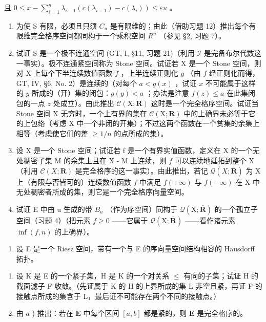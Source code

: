 且 \(0 \leqslant x - \sum_{i=1}^{n} \lambda_{i-1} (c(\lambda_{i-1}) - c(\lambda_i)) \leqslant \varepsilon u\) 。

\begin{enumerate}
\def\labelenumi{\alph{enumi})}
\setcounter{enumi}{4}
\item
  为使 S 有限，必须且只须 \(C_{u}\) 是有限维的；由此（借助习题 12）推出每个有限维完全格序空间都同构于一个乘积空间 \(R^{n}\) （参见 §2, 习题 7）。
\item
  试证 S 是一个极不连通空间 (GT, I, §11, 习题 21)（利用 \(\mathcal{I}\) 是完备布尔代数这一事实）。极不连通紧空间称为 Stone 空间。试证若 X 是一个 Stone 空间，则对 X 上每个下半连续数值函数 \(f\) ，上半连续正则化 \(g\) （由 \(f\) 经正则化而得，GT, IV, §6, No. 2）是连续的（对每个 \(a < g(x)\) ，试证 \(x\) 不可能属于这样的 \(y\) 所成的（开）集的闭包：\(g(y) < a\) ；办法是注意 \(f(z) \leqslant a\) 在此集闭包的一点 \(z\) 处成立）。由此推出 \(\mathcal{C}(\mathrm{X};\mathbf{R})\) 这时是一个完全格序空间。试证当 Stone 空间 X 无穷时，一个上有界的集在 \(\mathcal{C}(\mathrm{X};\mathbf{R})\) 中的上确界未必等于它的上包络（考虑 X 中一个非闭的开集）；不过这两个函数在一个贫集的余集上相等（考虑使它们的差 \(\geqslant 1/n\) 的点所成的集）。
\item
  设 X 是一个 Stone 空间；试证若 f 是一个有界实值函数，定义在 X 的一个无处稠密子集 M 的余集上且在 X - M 上连续，则 \(f\) 可以连续地延拓到整个 X（利用 \(\mathcal{C}(X; \mathbf{R})\) 是完全格序的这一事实）。由此推出，若记 \(\mathcal{Q}(X; \overline{\mathbf{R}})\) 为 X 上（有限与否皆可的）连续数值函数 \(f\) 中满足 \(f(+\infty)\) 与 \(f(-\infty)\) 在 X 中无处稠密者所成的集，则它是一个完全格序向量空间。
\item
  试证 E 中由 u 生成的带 \(B_{u}\) （作为序空间）同构于 \(\mathcal{Q}(\mathrm{X};\overline{\mathbf{R}})\) 的一个孤立子空间（习题 4）（把元素 \(f \geqslant 0\) ——它属于 \(\mathcal{Q}(\mathrm{X};\overline{\mathbf{R}})\) ——看作诸元素 \(\inf(f,n)\) 的上确界）。
\end{enumerate}

\begin{enumerate}
\def\labelenumi{\arabic{enumi})}
\setcounter{enumi}{13}
\tightlist
\item
  设 E 是一个 Riesz 空间，带有一个与 E 的序向量空间结构相容的 Hausdorff 拓扑。
\end{enumerate}

\begin{enumerate}
\def\labelenumi{\alph{enumi})}
\item
  设 K 是 E 的一个紧子集，H 是 K 的一个对关系 \(\leqslant\) 有向的子集；试证 H 的截面滤子 F 收敛。（先证属于 K 的 H 的上界所成的集 L 非空且紧，再证 F 的接触点所成的集含于 L，最后证不可能存在两个不同的接触点。）
\item
  由 \(a\) ) 推出：若在 \(\mathbf{E}\) 中每个区间 \([a,b]\) 都是紧的，则 \(\mathbf{E}\) 是完全格序的。
\end{enumerate}

